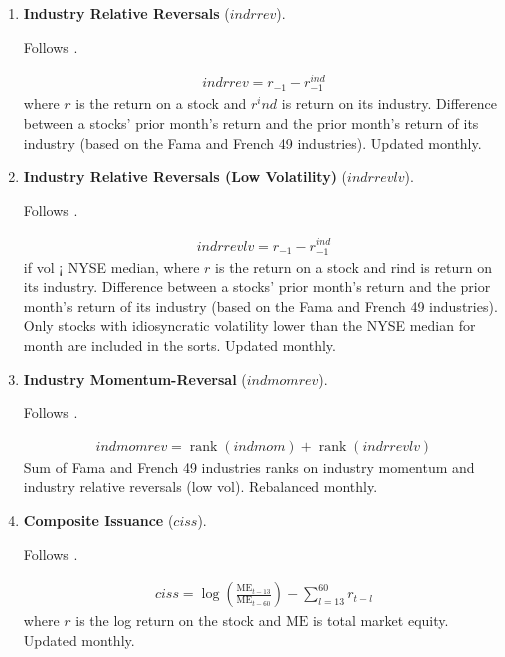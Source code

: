 \begin{enumerate}
	
	
	\item \textbf{Industry Relative Reversals} ($indrrev$). 
	
	Follows . 
	
	\begin{align*}
		indrrev = r_{-1} - r^{ind}_{-1}
	\end{align*}
	where $r$ is the return on a stock and $r^ind$ is return on its industry. Difference between a stocks' prior month's return and the prior month's return of its industry (based on the Fama and French 49 industries). Updated monthly.
	
	
	
	\item \textbf{Industry Relative Reversals (Low Volatility)} ($indrrevlv$). 
	
	Follows . 
	
	\begin{align*}
		indrrevlv = r_{-1} - r^{ind}_{-1}
	\end{align*}
	if vol ¡ NYSE median, where $r$ is the return on a
	stock and rind is return on its industry. Difference between a stocks' prior month's return and the prior month's return of its industry (based on the Fama and French 49 industries). Only stocks with idiosyncratic volatility lower than the NYSE median for month are included in the sorts. Updated monthly.
	
	
	
	\item \textbf{Industry Momentum-Reversal} ($indmomrev$). 
	
	Follows . 
	
	\begin{align*}
		indmomrev = \operatorname{rank}(indmom) + \operatorname{rank}(indrrevlv)
	\end{align*}
	Sum of Fama and French 49 industries ranks on industry momentum and industry relative reversals (low vol). Rebalanced monthly.
	
	
	
	\item \textbf{Composite Issuance} ($ciss$). 
	
	Follows . 
	
	\begin{align*}
		ciss = \log\left( \frac{ \mathrm{ME}_{t-13} }{ \mathrm{ME}_{t-60} } \right) - \sum^60_{l=13} r_{t-l}
	\end{align*}
	where $r$ is the log return on the stock and $\mathrm{ME}$ is total market equity. Updated monthly.
	

\end{enumerate}
